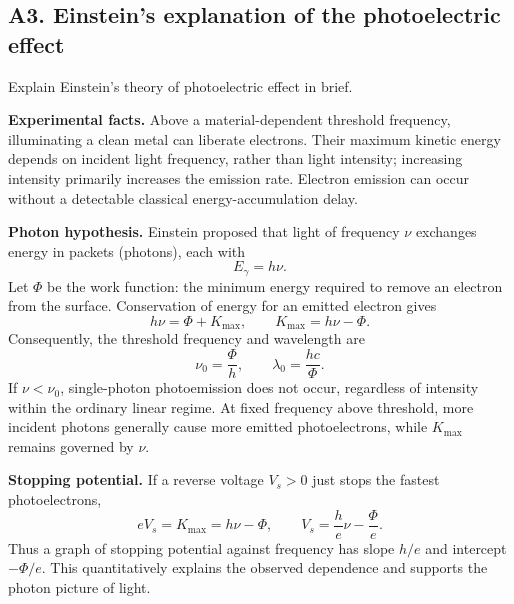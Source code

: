\documentclass[11pt,a4paper]{article}
\begin{document}
\subsection{A3. Einstein's explanation of the photoelectric effect}
\begin{questionbox}Explain Einstein's theory of photoelectric effect in brief.\end{questionbox}
\textbf{Experimental facts.} Above a material-dependent threshold frequency, illuminating a clean metal can liberate electrons. Their maximum kinetic energy depends on incident light frequency, rather than light intensity; increasing intensity primarily increases the emission rate. Electron emission can occur without a detectable classical energy-accumulation delay.\par
\textbf{Photon hypothesis.} Einstein proposed that light of frequency $\nu$ exchanges energy in packets (photons), each with
\begin{equation}E_\gamma=h\nu.
\end{equation}
Let $\Phi$ be the work function: the minimum energy required to remove an electron from the surface. Conservation of energy for an emitted electron gives
\begin{equation}\label{eq:photoeq}
h\nu=\Phi+K_{\max},\qquad \boxed{K_{\max}=h\nu-\Phi}.
\end{equation}
Consequently, the threshold frequency and wavelength are
\begin{equation}
\boxed{\nu_0=\frac{\Phi}{h}},\qquad \boxed{\lambda_0=\frac{hc}{\Phi}}.
\end{equation}
If $\nu<\nu_0$, single-photon photoemission does not occur, regardless of intensity within the ordinary linear regime. At fixed frequency above threshold, more incident photons generally cause more emitted photoelectrons, while $K_{\max}$ remains governed by $\nu$.\par
\textbf{Stopping potential.} If a reverse voltage $V_s>0$ just stops the fastest photoelectrons,
\begin{equation}
eV_s=K_{\max}=h\nu-\Phi,\qquad
\boxed{V_s=\frac{h}{e}\nu-\frac{\Phi}{e}}.
\end{equation}
Thus a graph of stopping potential against frequency has slope $h/e$ and intercept $-\Phi/e$. This quantitatively explains the observed dependence and supports the photon picture of light.
\end{document}
